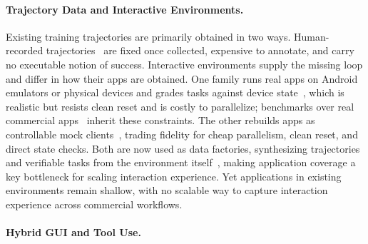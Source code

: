 \paragraph{Trajectory Data and Interactive Environments.}

Existing training trajectories are primarily obtained in two ways. Human-recorded trajectories~\citep{rawles2023androidinthewild, li2024effects, zhang2024android, lu2025guiodyssey} are fixed once collected, expensive to annotate, and carry no executable notion of success. Interactive environments supply the missing loop and differ in how their apps are obtained. One family runs real apps on Android emulators or physical devices and grades tasks against device state~\citep{rawles2025androidworld, xu2025androidlab, chai2026a3, chen2024spa}, which is realistic but resists clean reset and is costly to parallelize; benchmarks over real commercial apps~\citep{wu2026mobilebench, feng2026mobiflow, sui2026androiddaily} inherit these constraints. The other rebuilds apps as controllable mock clients~\citep{trivedi2024appworld, wu2026mobilegym, liu2026phoneworld}, trading fidelity for cheap parallelism, clean reset, and direct state checks. Both are now used as data factories, synthesizing trajectories and verifiable tasks from the environment itself~\citep{sun2025genesis, cheng2026openmobile, liu2026scalewob, cao2026gui, team2026hymobileagent}, making application coverage a key bottleneck for scaling interaction experience.
Yet applications in existing environments remain shallow, with no scalable way to capture interaction experience across commercial workflows.

\paragraph{Hybrid GUI and Tool Use.} 

